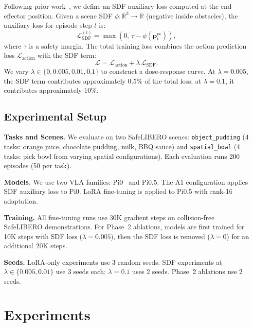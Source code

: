 \documentclass[10pt,letterpaper]{article}
\begin{document}
Following prior work~\cite{safelibero2025}, we define an SDF auxiliary loss computed at the end-effector position. Given a scene SDF $\phi: \mathbb{R}^3 \to \mathbb{R}$ (negative inside obstacles), the auxiliary loss for episode step $t$ is:
\begin{equation}
    \mathcal{L}_{\text{SDF}}^{(t)} = \max(0, \, \tau - \phi(\mathbf{p}_t^{\text{ee}})),
\end{equation}
where $\tau$ is a safety margin. The total training loss combines the action prediction loss $\mathcal{L}_{\text{action}}$ with the SDF term:
\begin{equation}
    \mathcal{L} = \mathcal{L}_{\text{action}} + \lambda \, \mathcal{L}_{\text{SDF}}.
\end{equation}
We vary $\lambda \in \{0, 0.005, 0.01, 0.1\}$ to construct a dose-response curve. At $\lambda = 0.005$, the SDF term contributes approximately 0.5\% of the total loss; at $\lambda = 0.1$, it contributes approximately 10\%.

\subsection{Experimental Setup}
\label{sec:setup}

\textbf{Tasks and Scenes.} We evaluate on two SafeLIBERO scenes: \texttt{object\_pudding} (4 tasks: orange juice, chocolate pudding, milk, BBQ sauce) and \texttt{spatial\_bowl} (4 tasks: pick bowl from varying spatial configurations). Each evaluation runs 200 episodes (50 per task).

\textbf{Models.} We use two VLA families: Pi0~\cite{pi02024} and Pi0.5. The A1 configuration applies SDF auxiliary loss to Pi0. LoRA fine-tuning is applied to Pi0.5 with rank-16 adaptation.

\textbf{Training.} All fine-tuning runs use 30K gradient steps on collision-free SafeLIBERO demonstrations. For Phase~2 ablations, models are first trained for 10K steps with SDF loss ($\lambda = 0.005$), then the SDF loss is removed ($\lambda = 0$) for an additional 20K steps.

\textbf{Seeds.} LoRA-only experiments use 3 random seeds. SDF experiments at $\lambda \in \{0.005, 0.01\}$ use 3 seeds each; $\lambda = 0.1$ uses 2 seeds. Phase~2 ablations use 2 seeds.

\section{Experiments}
\label{sec:experiments}
\end{document}
